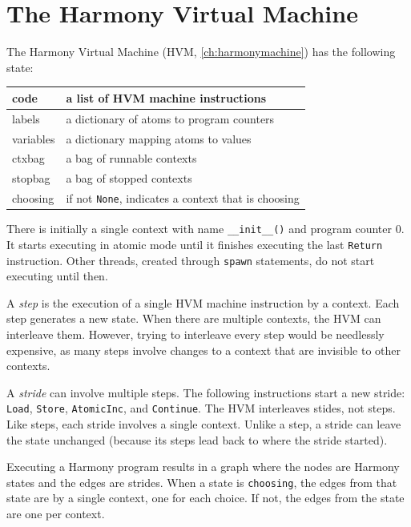 \documentclass{report}
\begin{document}
\chapter{The Harmony Virtual Machine}\label{app:hvm}

The Harmony Virtual Machine (HVM, \autoref{ch:harmonymachine})
has the following state:

\vspace{1em}
\begin{tabular}{|l|l|}
\hline
code & a list of HVM machine instructions \\
\hline
labels & a dictionary of atoms to program counters \\
\hline
variables & a dictionary mapping atoms to values \\
\hline
ctxbag & a bag of runnable contexts \\
\hline
stopbag & a bag of stopped contexts \\
\hline
choosing & if not \texttt{None}, indicates a context that is choosing \\
\hline
\end{tabular}
\vspace{1em}

There is initially a single context with name
\texttt{\_\_init\_\_()} and program counter 0.  It starts executing
in atomic mode until it finishes executing the last
\texttt{Return} instruction.
Other threads, created through \texttt{spawn} statements, do not
start executing until then.

A \emph{step} is the execution of a single HVM machine instruction
by a context.
Each step generates a new state.
When there are multiple contexts, the HVM can interleave them.
However, trying to interleave every step would be needlessly expensive,
as many steps involve changes to a context that are invisible to
other contexts.

A \emph{stride}
%
can involve multiple steps.  The following
instructions start a new stride: \texttt{Load}, \texttt{Store},
\texttt{AtomicInc}, and \texttt{Continue}.  The HVM
interleaves stides, not steps.  Like steps, each
stride involves a single context.  Unlike a step, a stride
can leave the state unchanged (because its steps lead back
to where the stride started).

Executing a Harmony program results in a graph where the nodes are Harmony
states and the edges are strides.
When a state is \texttt{choosing}, the edges from that state are
by a single context, one for each choice.  If not, the edges from
the state are one per context.
\end{document}
